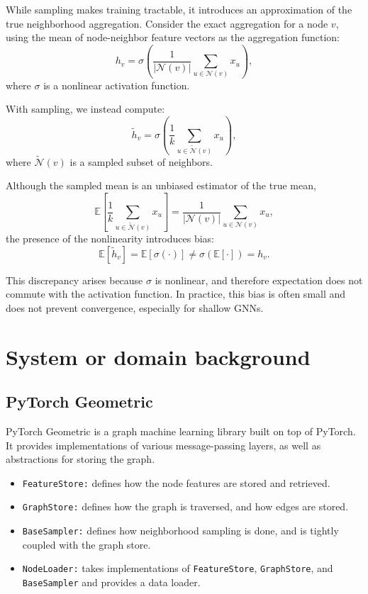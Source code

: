 \documentclass[PhD]{uclathes}
\begin{document}
While sampling makes training tractable, it introduces an approximation of the
true neighborhood aggregation. Consider the exact aggregation for a node $v$,
using the mean of node-neighbor feature vectors as the aggregation function:
\[
h_v = \sigma\!\left( \frac{1}{|\mathcal{N}(v)|} \sum_{u \in \mathcal{N}(v)} x_u \right),
\]
where $\sigma$ is a nonlinear activation function.

With sampling, we instead compute:
\[
\tilde{h}_v = \sigma\!\left( \frac{1}{k} \sum_{u \in \tilde{\mathcal{N}}(v)} x_u \right),
\]
where $\tilde{\mathcal{N}}(v)$ is a sampled subset of neighbors.

Although the sampled mean is an unbiased estimator of the true mean,
\[
\mathbb{E}\!\left[ \frac{1}{k} \sum_{u \in \tilde{\mathcal{N}}(v)} x_u \right]
=
\frac{1}{|\mathcal{N}(v)|} \sum_{u \in \mathcal{N}(v)} x_u,
\]
the presence of the nonlinearity introduces bias:
\[
\mathbb{E}[\tilde{h}_v]
=
\mathbb{E}\!\left[\sigma\!\left( \cdot \right)\right]
\neq
\sigma\!\left( \mathbb{E}[\cdot] \right)
=
h_v.
\]

This discrepancy arises because $\sigma$ is nonlinear, and therefore
expectation does not commute with the activation function. In practice, this
bias is often small and does not prevent convergence, especially for shallow
GNNs.

\section{System or domain background}
\subsection{PyTorch Geometric}\label{sec:pyg}
PyTorch Geometric is a graph machine learning library built on top of PyTorch.
It provides implementations of various message-passing layers, as well as
abstractions for storing the graph.

\begin{itemize}
    \item \texttt{FeatureStore:} defines how the node features are stored and retrieved.
    \item \texttt{GraphStore:} defines how the graph is traversed, and how edges are stored.
    \item \texttt{BaseSampler:} defines how neighborhood sampling is done, and is tightly coupled with the graph store.
    \item \texttt{NodeLoader:} takes implementations of \texttt{FeatureStore}, \texttt{GraphStore}, and \texttt{BaseSampler} and provides a data loader.
\end{itemize}
\end{document}
